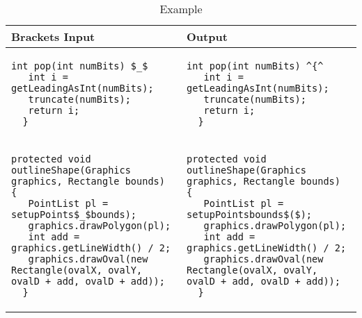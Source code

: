 \begin{landscape}
\begin{table}[p]
\begin{tabular}{ | m{10cm} | m{10cm} | }
  \hline
  Brackets Input & Output \\
  \hline
  {\begin{lstlisting}[style=table]
  int pop(int numBits) $_$
   int i = getLeadingAsInt(numBits);
   truncate(numBits);
   return i;
  }
  \end{lstlisting}} &
  {\begin{lstlisting}[style=table]
  int pop(int numBits) ^{^
   int i = getLeadingAsInt(numBits);
   truncate(numBits);
   return i;
  }
  \end{lstlisting}} \\
  \hline
  {\begin{lstlisting}[style=table]
  protected void outlineShape(Graphics graphics, Rectangle bounds) {
   PointList pl = setupPoints$_$bounds);
   graphics.drawPolygon(pl);
   int add = graphics.getLineWidth() / 2;
   graphics.drawOval(new Rectangle(ovalX, ovalY, ovalD + add, ovalD + add));
  }
  \end{lstlisting}} &
  {\begin{lstlisting}[style=table]
  protected void outlineShape(Graphics graphics, Rectangle bounds) {
   PointList pl = setupPointsbounds$($);
   graphics.drawPolygon(pl);
   int add = graphics.getLineWidth() / 2;
   graphics.drawOval(new Rectangle(ovalX, ovalY, ovalD + add, ovalD + add));
  }
  \end{lstlisting}} \\
  \hline
\end{tabular}
\caption{Example}
\label{brackets_showcase_table}
\end{table}


\end{landscape}
